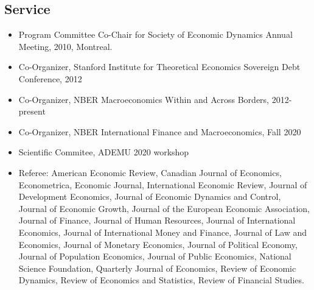 \documentclass[12pt]{article}
\begin{document}

 




 \subsection*{Service}

 \begin{itemize}[left=0pt .. \parindent, label=]

\item Program Committee Co-Chair for Society of Economic Dynamics Annual
 Meeting, 2010, Montreal.

 \item Co-Organizer, Stanford Institute for Theoretical Economics Sovereign
 Debt Conference, 2012
 
 \item Co-Organizer, NBER Macroeconomics Within and Across Borders,
 2012-present
 
 \item Co-Organizer, NBER International Finance and Macroeconomics,
 Fall 2020
  
 \item Scientific Commitee, ADEMU 2020 workshop

      
 \item Referee: American Economic Review, Canadian Journal of Economics,
 Econometrica, Economic Journal, International Economic Review, Journal
 of Development Economics, Journal of Economic Dynamics and Control,
 Journal of Economic Growth, Journal of the European Economic
 Association, Journal of Finance, Journal of Human Resources, Journal of
 International Economics, Journal of International Money and Finance,
 Journal of Law and Economics, Journal of Monetary Economics, Journal of
 Political Economy, Journal of Population Economics, Journal of Public
 Economics, National Science Foundation, Quarterly Journal of Economics,
 Review of Economic Dynamics, Review of Economics and Statistics, Review
 of Financial Studies.
 
\end{itemize}
\end{document}
